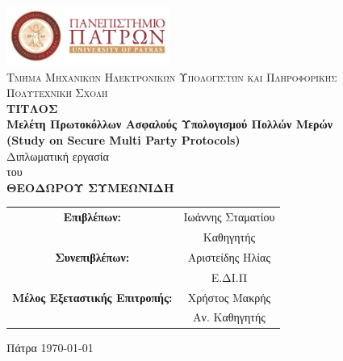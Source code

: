\begin{titlepage}
    \begin{center}
        \includegraphics[width=0.4\textwidth]{00_preamble/images/upatras}
        \vspace*{1cm}
        \\ \textsc{Τμήμα Μηχανικών Ηλεκτρονικών Υπολογιστών και Πληροφορικής
        \\Πολυτεχνική Σχολή}
        \vspace{0.3cm}
    \large{
    \textbf{\\ΤΙΤΛΟΣ \\ Μελέτη Πρωτοκόλλων Ασφαλούς Υπολογισμού Πολλών Μερών
    \\ (Study on Secure Multi Party Protocols)}}
        \vspace{0.5cm}
        \\Διπλωματική εργασία \\
        του\\
        \vspace{0.5cm}
        \textbf{ΘΕΟΔΩΡΟΥ ΣΥΜΕΩΝΙΔΗ}\\
        \vspace{1cm}
        
    \end{center}
    \begin{center}
        \begin{tabular}{ c c } 
            \textbf{Επιβλέπων:} & Ιωάννης Σταματίου \\ 
              & Καθηγητής  \\
            \textbf{Συνεπιβλέπων:} & Αριστείδης Ηλίας \\ 
              & Ε.ΔΙ.Π \\
            \textbf{Μέλος Εξεταστικής Επιτροπής:} & Χρήστος Μακρής  \\
            & Αν. Καθηγητής \\

        \end{tabular}
    \end{center}
    \begin{center}
        \vfill
        Πάτρα \today
    \end{center}

\end{titlepage}